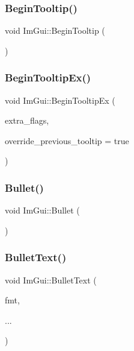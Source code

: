 \mbox{\label{namespace_im_gui_a36816a48385f4759d746a03cf6202512}} 
\subsubsection{\texorpdfstring{Begin\+Tooltip()}{BeginTooltip()}}
{\footnotesize\ttfamily void Im\+Gui\+::\+Begin\+Tooltip (\begin{DoxyParamCaption}{ }\end{DoxyParamCaption})}

\mbox{\label{namespace_im_gui_a3189530b7795a9b99169eb95f36c516d}} 
\subsubsection{\texorpdfstring{Begin\+Tooltip\+Ex()}{BeginTooltipEx()}}
{\footnotesize\ttfamily void Im\+Gui\+::\+Begin\+Tooltip\+Ex (\begin{DoxyParamCaption}\item[{\mbox{\hyperlink{imgui_8h_a0b8e067ab4f7a818828c8d89e531addc}{Im\+Gui\+Window\+Flags}}}]{extra\+\_\+flags,  }\item[{bool}]{override\+\_\+previous\+\_\+tooltip = {\ttfamily true} }\end{DoxyParamCaption})}

\mbox{\label{namespace_im_gui_ae2d22212681556d2c2398dfd152f3121}} 
\subsubsection{\texorpdfstring{Bullet()}{Bullet()}}
{\footnotesize\ttfamily void Im\+Gui\+::\+Bullet (\begin{DoxyParamCaption}{ }\end{DoxyParamCaption})}

\mbox{\label{namespace_im_gui_af8d34d563b17c683943a0fa7bf5807bc}} 
\subsubsection{\texorpdfstring{Bullet\+Text()}{BulletText()}}
{\footnotesize\ttfamily void Im\+Gui\+::\+Bullet\+Text (\begin{DoxyParamCaption}\item[{const char $\ast$}]{fmt,  }\item[{}]{... }\end{DoxyParamCaption})}

